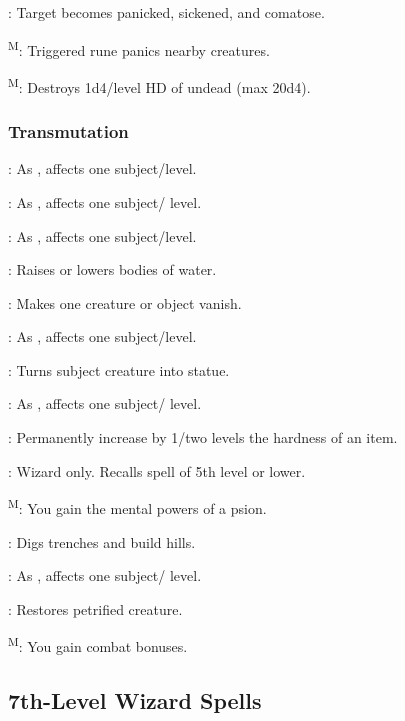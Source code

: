 	: Target becomes panicked, sickened, and comatose.

	\textsuperscript{M}: Triggered rune panics nearby creatures.

	\textsuperscript{M}: Destroys 1d4/level HD of undead (max 20d4).

\subsubsection{Transmutation}
	: As , affects one subject/level.

	: As , affects one subject/ level.

	: As , affects one subject/level.

	: Raises or lowers bodies of water.

	: Makes one creature or object vanish.

	: As , affects one subject/level.

	: Turns subject creature into statue.

	: As , affects one subject/ level.

	: Permanently increase by 1/two levels the hardness of an item.

	: Wizard only. Recalls spell of 5th level or lower.

	\textsuperscript{M}: You gain the mental powers of a psion.

	: Digs trenches and build hills.

	: As , affects one subject/ level.

	: Restores petrified creature.

	\textsuperscript{M}: You gain combat bonuses.



\subsection{7th-Level Wizard Spells}

